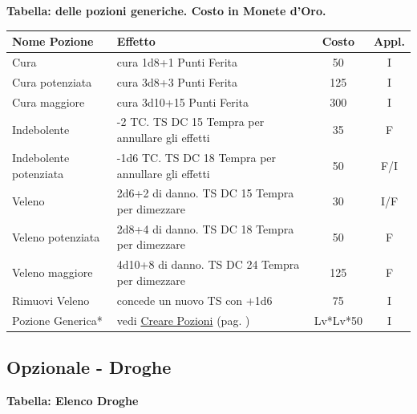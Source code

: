 \textbf{Tabella: delle pozioni generiche. Costo in Monete d'Oro.}\label{pozionigeneriche}\hypertarget{pozionigeneriche}{}

\medskip

\noindent\begin{tabularx}{1\linewidth}{lXcc}
\textbf{Nome Pozione}& \textbf{Effetto}&\textbf{Costo}& \textbf{Appl.}\\
\toprule
Cura& cura 1d8+1 Punti Ferita & 50 & I\\
\toprule
Cura potenziata& cura 3d8+3 Punti Ferita & 125& I\\
\toprule
Cura maggiore& cura 3d10+15 Punti Ferita & 300& I\\
\toprule
Indebolente& -2 TC. TS DC 15 Tempra per annullare gli effetti& 35 & F\\
\toprule
Indebolente potenziata& -1d6 TC. TS DC 18 Tempra per annullare gli effetti& 50 & F/I \\
\toprule
Veleno&2d6+2 di danno. TS DC 15 Tempra per dimezzare& 30 & I/F \\
\toprule
Veleno potenziata& 2d8+4 di danno. TS DC 18 Tempra per dimezzare & 50 & F \\
\toprule
Veleno maggiore& 4d10+8 di danno. TS DC 24 Tempra per dimezzare& 125 & F \\
\toprule
Rimuovi Veleno& concede un nuovo TS con +1d6 & 75 & I\\
\toprule
Pozione Generica* & vedi \hyperlink{crearepozioni}{Creare Pozioni} (pag. \pageref{crearepozioni}) &Lv*Lv*50&I

\end{tabularx}



\subsection{Opzionale - Droghe}\hypertarget{droghe}{}\label{droghe}



\textbf{Tabella: Elenco Droghe}

\medskip

